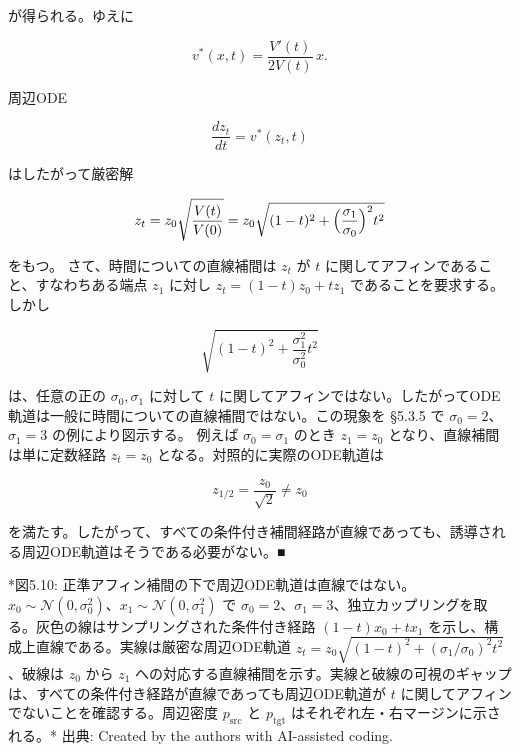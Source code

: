 が得られる。ゆえに

\[
v^*(x,t)=\frac{V'(t)}{2V(t)}\,x.
\]


周辺ODE

\[
\frac{dz_t}{dt}=v^*(z_t,t)
\]


はしたがって厳密解

\[
z_t=z_0\sqrt{\frac{V(t)}{V(0)}}=z_0\sqrt{(1-t)^2+\Bigl(\frac{\sigma_1}{\sigma_0}\Bigr)^2 t^2}
\]


をもつ。
さて、時間についての直線補間は $z_t$ が $t$ に関してアフィンであること、すなわちある端点 $z_1$ に対し $z_t=(1-t)z_0+t z_1$ であることを要求する。しかし

\[
\sqrt{(1-t)^2+\frac{\sigma_1^2}{\sigma_0^2}t^2}
\]


は、任意の正の $\sigma_0,\sigma_1$ に対して $t$ に関してアフィンではない。したがってODE軌道は一般に時間についての直線補間ではない。この現象を §5.3.5 で $\sigma_0=2$、$\sigma_1=3$ の例により図示する。
例えば $\sigma_0=\sigma_1$ のとき $z_1=z_0$ となり、直線補間は単に定数経路 $z_t=z_0$ となる。対照的に実際のODE軌道は

\[
z_{1/2}=\frac{z_0}{\sqrt{2}}\neq z_0
\]


を満たす。したがって、すべての条件付き補間経路が直線であっても、誘導される周辺ODE軌道はそうである必要がない。■



*図5.10: 正準アフィン補間の下で周辺ODE軌道は直線ではない。$x_0\sim\mathcal{N}(0,\sigma_0^2)$、$x_1\sim\mathcal{N}(0,\sigma_1^2)$ で $\sigma_0=2$、$\sigma_1=3$、独立カップリングを取る。灰色の線はサンプリングされた条件付き経路 $(1-t)x_0+tx_1$ を示し、構成上直線である。実線は厳密な周辺ODE軌道 $z_t=z_0\sqrt{(1-t)^2+(\sigma_1/\sigma_0)^2 t^2}$、破線は $z_0$ から $z_1$ への対応する直線補間を示す。実線と破線の可視のギャップは、すべての条件付き経路が直線であっても周辺ODE軌道が $t$ に関してアフィンでないことを確認する。周辺密度 $p_{\mathrm{src}}$ と $p_{\mathrm{tgt}}$ はそれぞれ左・右マージンに示される。*
出典: Created by the authors with AI-assisted coding.

